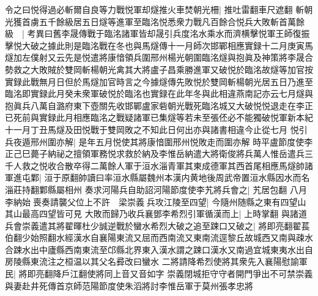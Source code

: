 令之曰悦得過必斬爾自良等力戰悦軍却燧推火車焚朝光柵|{
	推吐雷翻車尺遮翻}
斬朝光獲首虜五千餘級居五日燧等進軍至臨洺悦悉衆力戰凡百餘合悦兵大敗斬首萬餘級　|{
	考異曰舊李晟傳戰于臨洺諸軍皆却晟引兵度洺水乘水而濟横擊悦軍王師復振擊悦大破之據此則是臨洺戰在冬也與馬燧傳十一月師次邯鄲相應實録十二月庚寅馬燧加左僕射又云先是悦遣將康愔領兵圍邢州楊光朝圍臨洺燧與抱眞及神策將李晟合勢救之大敗賊於雙岡斬楊朝光禽其大將盧子昌乘勝進軍又破悦於臨洺故燧等加官按實録此戰無月日但於馬燧加官時言之今據燧傳先敗悦於雙岡斬楊朝光居五日乃進至臨洺即實録此月癸未衆軍破悦於臨洺也實録在此年冬與此相違燕南記亦云七月燧與抱眞兵八萬自潞府東下壺關先收邯鄲盧家砦朝光戰死臨洺城又大破悦悦退走在李正已死前與實録此月相應臨洺之戰疑諸軍已集燧等若未至張伾必不能獨破悦軍新本紀十一月丁丑馬燧及田悦戰于雙岡敗之不知此日何出亦與諸書相違今止從七月}
悦引兵夜遁邢州圍亦解|{
	是年五月悦使其將康愔圍邢州悦敗走而圍亦解}
時平盧節度使李正己巳薨子納祕之擅領軍務悦求救於納及李惟岳納遣大將衛俊將兵萬人惟岳遣兵三千人救之悦收合散卒得二萬餘人軍于洹水淄青軍其東成德軍其西首尾相應馬燧帥諸軍進屯鄴|{
	洹于原翻帥讀曰率洹水縣屬魏州本漢内黄地後周武帝置洹水縣因水而名淄莊持翻鄴縣屬相州}
奏求河陽兵自助詔河陽節度使李艽將兵會之|{
	艽居包翻}
八月李納始喪奏請襲父位上不許　梁崇義兵攻江陵至四望|{
	今隨州随縣之東有四望山其山最高四望皆可見}
大敗而歸乃收兵襄鄧李希烈引軍循漢而上|{
	上時掌翻}
與諸道兵會崇義遣其將翟暉杜少誠逆戰於蠻水希烈大破之追至踈口又破之|{
	將即亮翻翟萇伯翻少始照翻水經漢水自襄陽東流又屈而西南流又東南流逕黎丘故城西又南與疎水合踈水出中廬縣西南東流至邙縣北界東入漢水謂之踈口漢水又南過宜城東夷水出自房陵縣東流注之桓温以其父名彛改曰蠻水}
二將請降希烈使將其衆先入襄陽慰諭軍民|{
	將即亮翻降戶江翻使將同上音又音如字}
崇義閉城拒守守者開門爭出不可禁崇義與妻赴井死傳首京師范陽節度使朱滔將討李惟岳軍于莫州張孝忠將

